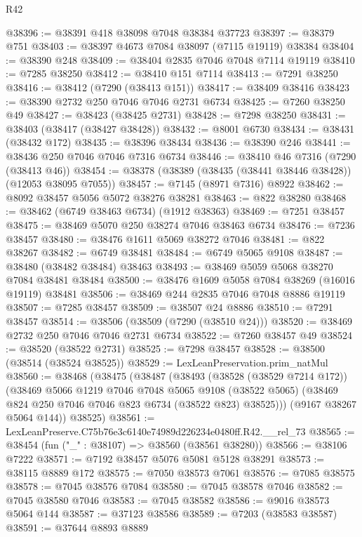 \begin{lexlean}{R42}
\begin{coremodule}
{@38396 := @38391 @418 @38098 @7048 @38384 @37723
@38397 := @38379 @751
@38403 := @38397 @4673 @7084 @38097 (@7115 @19119) @38384
@38404 := @38390 @248
@38409 := @38404 @2835 @7046 @7048 @7114 @19119
@38410 := @7285 @38250
@38412 := @38410 @151 @7114
@38413 := @7291 @38250
@38416 := @38412 (@7290 (@38413 @151))
@38417 := @38409 @38416
@38423 := @38390 @2732 @250 @7046 @7046 @2731 @6734
@38425 := @7260 @38250 @49
@38427 := @38423 (@38425 @2731)
@38428 := @7298 @38250
@38431 := @38403 (@38417 (@38427 @38428))
@38432 := @8001 @6730
@38434 := @38431 (@38432 @172)
@38435 := @38396 @38434
@38436 := @38390 @246
@38441 := @38436 @250 @7046 @7046 @7316 @6734
@38446 := @38410 @46 @7316 (@7290 (@38413 @46))
@38454 := @38378 (@38389 (@38435 (@38441 @38446 @38428)) (@12053 @38095 @7055))
@38457 := @7145 (@8971 @7316) @8922
@38462 := @8092 @38457 @5056 @5072 @38276 @38281
@38463 := @822 @38280
@38468 := @38462 (@6749 @38463 @6734) (@1912 @38363)
@38469 := @7251 @38457
@38475 := @38469 @5070 @250 @38274 @7046 @38463 @6734
@38476 := @7236 @38457
@38480 := @38476 @1611 @5069 @38272 @7046
@38481 := @822 @38267
@38482 := @6749 @38481
@38484 := @6749 @5065 @9108
@38487 := @38480 (@38482 @38484) @38463
@38493 := @38469 @5059 @5068 @38270 @7084 @38481 @38484
@38500 := @38476 @1609 @5058 @7084 @38269 (@16016 @19119) @38481
@38506 := @38469 @244 @2835 @7046 @7048 @8886 @19119
@38507 := @7285 @38457
@38509 := @38507 @24 @8886
@38510 := @7291 @38457
@38514 := @38506 (@38509 (@7290 (@38510 @24)))
@38520 := @38469 @2732 @250 @7046 @7046 @2731 @6734
@38522 := @7260 @38457 @49
@38524 := @38520 (@38522 @2731)
@38525 := @7298 @38457
@38528 := @38500 (@38514 (@38524 @38525))
@38529 := LexLeanPreservation.prim_natMul
@38560 := @38468
    (@38475
      (@38487
        (@38493
          (@38528 (@38529 @7214 @172))
          (@38469
            @5066
            @1219
            @7046
            @7048
            @5065
            @9108
            (@38522 @5065)
            (@38469 @824 @250 @7046 @7046 @823 @6734 (@38522 @823) @38525)))
        (@9167 @38267 @5064 @144))
      @38525)
@38561 := LexLeanPreserve.C75b76e3c6140e74989d226234e0480ff.R42.__rel_73
@38565 := @38454 (fun ("_" : @38107) => @38560 (@38561 @38280))
@38566 := @38106 @7222
@38571 := @7192 @38457 @5076 @5081 @5128 @38291
@38573 := @38115 @8889 @172
@38575 := @7050 @38573 @7061
@38576 := @7085 @38575
@38578 := @7045 @38576 @7084
@38580 := @7045 @38578 @7046
@38582 := @7045 @38580 @7046
@38583 := @7045 @38582
@38586 := @9016 @38573 @5064 @144
@38587 := @37123 @38586
@38589 := @7203 (@38583 @38587)
@38591 := @37644 @8893 @8889
}
\end{coremodule}
\end{lexlean}

